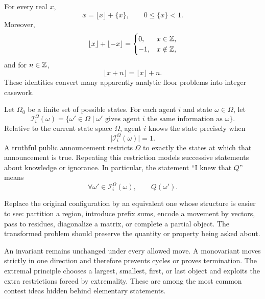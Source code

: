     \begin{tactic}
        For every real $x$,
        \[
            x=\lfloor x\rfloor+\{x\},
            \qquad
            0\leq\{x\}<1.
        \]
        Moreover,
        \[
            \lfloor x\rfloor+\lfloor-x\rfloor
            =
            \begin{cases}
                0, & x\in\mathbb{Z},\\
                -1, & x\notin\mathbb{Z},
            \end{cases}
        \]
        and for $n\in\mathbb{Z}$,
        \[
            \lfloor x+n\rfloor=\lfloor x\rfloor+n.
        \]
        These identities convert many apparently analytic floor problems into
        integer casework.
    \end{tactic}

    \begin{strategy}
        Let $\Omega_0$ be a finite set of possible states. For each agent $i$ and
        state $\omega\in\Omega$, let
        \[
            \mathcal{I}_i^\Omega(\omega)
            =
            \{\omega'\in\Omega\mid
              \omega'\text{ gives agent }i\text{ the same information as }\omega\}.
        \]
        Relative to the current state space $\Omega$, agent $i$ knows the state
        precisely when
        \[
            \bigl|\mathcal{I}_i^\Omega(\omega)\bigr|=1.
        \]
        A truthful public announcement restricts $\Omega$ to exactly the states
        at which that announcement is true. Repeating this restriction models
        successive statements about knowledge or ignorance. In particular, the
        statement ``I knew that $Q$'' means
        \[
            \forall\omega'\in\mathcal{I}_i^\Omega(\omega),
            \qquad
            Q(\omega').
        \]
    \end{strategy}

    \begin{strategy}
        Replace the original configuration by an equivalent one whose structure
        is easier to see: partition a region, introduce prefix sums, encode a
        movement by vectors, pass to residues, diagonalize a matrix, or complete
        a partial object. The transformed problem should preserve the quantity or
        property being asked about.
    \end{strategy}

    \begin{strategy}
        An invariant remains unchanged under every allowed move. A monovariant
        moves strictly in one direction and therefore prevents cycles or proves
        termination. The extremal principle chooses a largest, smallest, first,
        or last object and exploits the extra restrictions forced by extremality.
        These are among the most common contest ideas hidden behind elementary
        statements.
    \end{strategy}

